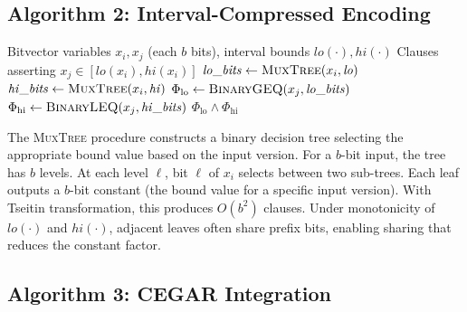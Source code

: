 \documentclass[10pt,twocolumn]{article}
\begin{document}
\subsection{Algorithm 2: Interval-Compressed Encoding}
\label{sec:alg-interval}

\begin{algorithm}[t]
\caption{\textsc{IntervalEncode}: Binary arithmetic encoding of interval compatibility}
\label{alg:interval}
\begin{algorithmic}[1]
\Require Bitvector variables $x_i, x_j$ (each $b$ bits), interval bounds $\mathit{lo}(\cdot), \mathit{hi}(\cdot)$
\Ensure Clauses asserting $x_j \in [\mathit{lo}(x_i), \mathit{hi}(x_i)]$
\State $\mathit{lo\_bits} \gets \textsc{MuxTree}(x_i, \mathit{lo})$ 
\State $\mathit{hi\_bits} \gets \textsc{MuxTree}(x_i, \mathit{hi})$ 
\State $\Phi_{\mathrm{lo}} \gets \textsc{BinaryGEQ}(x_j, \mathit{lo\_bits})$ 
\State $\Phi_{\mathrm{hi}} \gets \textsc{BinaryLEQ}(x_j, \mathit{hi\_bits})$ 
\State \Return $\Phi_{\mathrm{lo}} \wedge \Phi_{\mathrm{hi}}$
\end{algorithmic}
\end{algorithm}

The \textsc{MuxTree} procedure constructs a binary decision tree selecting the appropriate bound value based on the input version. For a $b$-bit input, the tree has $b$ levels. At each level $\ell$, bit $\ell$ of $x_i$ selects between two sub-trees. Each leaf outputs a $b$-bit constant (the bound value for a specific input version). With Tseitin transformation, this produces $O(b^2)$ clauses. Under monotonicity of $\mathit{lo}(\cdot)$ and $\mathit{hi}(\cdot)$, adjacent leaves often share prefix bits, enabling sharing that reduces the constant factor.

\subsection{Algorithm 3: CEGAR Integration}
\label{sec:alg-cegar}
\end{document}
